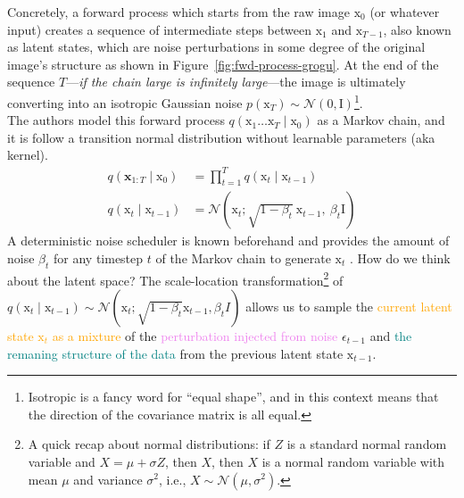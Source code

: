\noindent Concretely, a forward process which starts from the raw image $\mathrm{x}_{0}$ (or whatever input) creates a sequence of intermediate steps between $\mathrm{x}_{1}$ and $\mathrm{x}_{T-1}$, also known as latent states, which are noise perturbations in some degree of the original image's structure as shown in Figure~\ref{fig:fwd-process-grogu}. At the end of the sequence $T$---\textit{if the chain large is infinitely large}---the image is ultimately converting into an isotropic Gaussian noise $p(\mathrm{x}_{T})\sim \mathcal{N}(\mathrm{0}, \mathrm{I})$\footnote{Isotropic is a fancy word for ``equal shape'', and in this context means that the direction of the covariance matrix is all equal.}.\\

\noindent The authors model this forward process $q(\mathrm{x}_{1}\dots\mathrm{x}_{T}\mid\mathrm{x}_{0})$ as a Markov chain, and it is follow a transition normal distribution without learnable parameters (aka kernel). 
\begin{align}\label{eqn:forward-process}
q(\mathbf{x}_{1:T}\mid\mathrm{x}_0) &= \prod_{t=1}^{T}q(\mathrm{x}_t\mid\mathrm{x}_{t-1})
\\
q(\mathrm{x}_t\mid\mathrm{x}_{t-1}) &= \mathcal{N}(\mathrm{x}_t;\sqrt{1-\beta_{t}}~\mathrm{x}_{t-1},~ \beta_{t}\mathrm{I})
\end{align}
A deterministic noise scheduler is known beforehand and provides the
amount of noise $\beta_{t}$ for any timestep $t$ of the Markov chain to
generate $\mathrm{x}_{t}$ . How do we think about the latent space? The scale-location transformation\footnote{A quick recap about normal distributions: if $Z$ is a standard normal random variable and $X=\mu + \sigma Z$, then $X$, then $X$ is a normal random variable with mean $\mu$ and variance $\sigma^2$, i.e., $X\sim\mathcal{N}(\mu, \sigma^2)$.} of $q(\mathrm{x}_{t}\mid\mathrm{x}_{t-1})\sim\mathcal{N}(\mathrm{x}_{t}; \sqrt{1-\beta_{t}} \mathrm{x}_{t-1}, \beta_{t}I)$ allows us to sample the \textcolor{orange}{current latent state $\mathrm{x}_{t}$ as a mixture} of the 
\textcolor{violet}{perturbation injected from noise} $\epsilon_{t-1}$ and \textcolor{teal}{the remaning structure
of the data} from the previous latent state $\mathrm{x}_{t-1}$.

